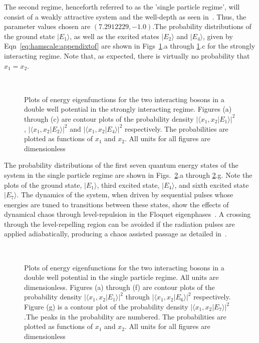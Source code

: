 The second regime, henceforth referred to as the 'single particle regime', will consist of a weakly attractive system and the well-depth as seen in~\cite{mypaper}. Thus, the parameter values chosen are $\left(7.2912229, -1.0\right)$.The probability distributions of the ground state  $|E_1\rangle$, as well as the excited states  $|E_2\rangle$ and  $|E_4\rangle$, given by Eqn~\ref{eq:hamscale:appendixtof}  are shown in Figs~\ref{fig:wavefunctions_tonks:appendixtof}.a through \ref{fig:wavefunctions_tonks:appendixtof}.c for the strongly interacting regime. Note that, as expected, there is virtually no probability that $x_1=x_2$.
\begin{figure}
\ 
\caption{Plots of energy eigenfunctions for the two interacting bosons in a double well potential in the strongly interacting regime. Figures (a) through (c) are contour plots of the probability density $|\langle x_1,x_2|E_1\rangle|^2$ ,  $|\langle x_1,x_2|E_2\rangle|^2$  and $|\langle x_1,x_2|E_4\rangle|^2$ respectively. The probabilities are plotted as functions of $x_1$ and $x_2$. All units for all figures are dimensionless}
\label{fig:wavefunctions_tonks:appendixtof}
\end{figure}
The probability distributions of the first seven quantum energy states of the system in the single particle regime are shown in Figs.~\ref{fig:wavefunctions:appendixtof}.a through  \ref{fig:wavefunctions:appendixtof}.g. Note the plots of the ground state, $|E_1\rangle$, third excited state, $|E_4\rangle$,  and sixth excited state $|E_7\rangle$. The dynamics of the system, when driven by sequential pulses whose energies are tuned to transitions between these states, show the effects of dynamical chaos through level-repulsion in the Floquet eigenphases~\cite{mypaper}. A crossing through the level-repelling region can be avoided if the radiation pulses are applied adiabatically, producing a chaos assisted passage as detailed in~\cite{mypaper}.
\begin{figure}
\ 
\caption{Plots of energy eigenfunctions for the two interacting bosons in a double well potential in the single particle regime. All units are dimensionless. Figures (a) through (f) are contour plots of the probability density $|\langle x_1,x_2|E_1\rangle|^2$ through $|\langle x_1,x_2|E_6\rangle|^2$ respectively. Figure (g) is a contour plot of the probability density
$|\langle x_1,x_2|E_7\rangle|^2$.The peaks in the probability are numbered. The probabilities are plotted as functions of $x_1$ and $x_2$. All units for all figures are dimensionless}
\label{fig:wavefunctions:appendixtof}
\end{figure}
%

